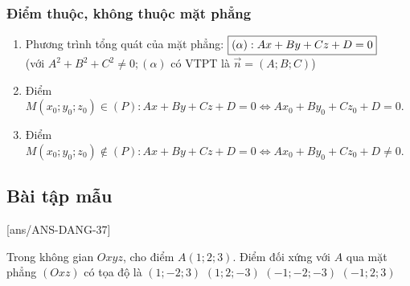 \begin{khung}
\subsubsection{Điểm thuộc, không thuộc mặt phẳng}
	\begin{enumerate}
	\item Phương trình tổng quát của mặt phẳng: $\fbox{$(\alpha): A x+B y+C z+D=0$}$\\
	(với $A^{2}+B^{2}+C^{2} \neq 0 ;(\alpha)$ có VTPT là $\vec{n}=(A ; B ; C)$)
	\item 
	Điểm $M(x_0;y_0;z_0)\in (P)\colon Ax+By+Cz+D=0\Leftrightarrow Ax_0+By_0+Cz_0+D=0$.
	\item Điểm $M(x_0;y_0;z_0)\notin (P)\colon Ax+By+Cz+D=0\Leftrightarrow Ax_0+By_0+Cz_0+D\ne 0$.
\end{enumerate}
\end{khung}

\subsection{Bài tập mẫu}
[ans/ANS-DANG-37]
\begin{khung}
		\begin{vd}%
		Trong không gian $O x y z$, cho điểm $A(1; 2; 3)$. Điểm đối xứng với $A$ qua mặt phẳng $(O x z)$ có tọa độ là
		\choice
		{\True $(1;-2; 3)$}
		{$(1; 2;-3)$}
		{$(-1;-2;-3)$}
		{$(-1; 2; 3)$}
	\end{vd}

\end{khung}
